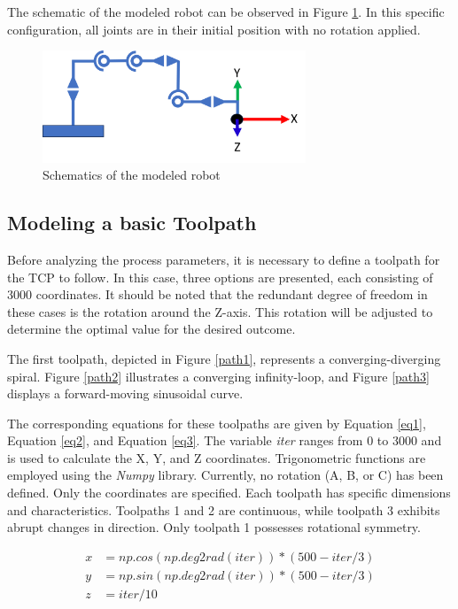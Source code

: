 The schematic of the modeled robot can be observed in Figure \ref{schema}. In this specific configuration, all joints are in their initial position with no rotation applied.


\begin{figure}[H]
	\centerline{\includegraphics[width=0.7\textwidth]{figures/schema.png}}
	\caption{Schematics of the modeled robot}
	\label{schema}
\end{figure}

\subsection{Modeling a basic Toolpath}\label{MBT}
Before analyzing the process parameters, it is necessary to define a toolpath for the TCP to follow. In this case, three options are presented, each consisting of 3000 coordinates. It should be noted that the redundant degree of freedom in these cases is the rotation around the Z-axis. This rotation will be adjusted to determine the optimal value for the desired outcome.

The first toolpath, depicted in Figure \ref{path1}, represents a converging-diverging spiral. Figure \ref{path2} illustrates a converging infinity-loop, and Figure \ref{path3} displays a forward-moving sinusoidal curve.

The corresponding equations for these toolpaths are given by Equation \ref{eq1}, Equation \ref{eq2}, and Equation \ref{eq3}. The variable \textit{iter} ranges from 0 to 3000 and is used to calculate the X, Y, and Z coordinates. Trigonometric functions are employed using the \textit{Numpy} library. Currently, no rotation (A, B, or C) has been defined. Only the coordinates are specified. Each toolpath has specific dimensions and characteristics. Toolpaths 1 and 2 are continuous, while toolpath 3 exhibits abrupt changes in direction. Only toolpath 1 possesses rotational symmetry.

\begin{equation}\label{eq1}
\begin{split}
x &= np.cos(np.deg2rad(iter)) * (500 - iter / 3)\\
y &= np.sin(np.deg2rad(iter)) * (500 - iter / 3)\\
z &= iter / 10
\end{split}
\end{equation}


